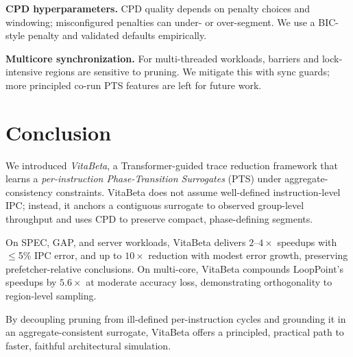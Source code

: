 \documentclass[conference]{IEEEtran}
\begin{document}
\textbf{CPD hyperparameters.} CPD quality depends on penalty choices and windowing; misconfigured penalties can under- or over-segment. We use a BIC-style penalty and validated defaults empirically.

\textbf{Multicore synchronization.} For multi-threaded workloads, barriers and lock-intensive regions are sensitive to pruning. We mitigate this with sync guards; more principled co-run PTS features are left for future work.

\section{Conclusion}
\label{summary}
We introduced \emph{VitaBeta}, a Transformer-guided trace reduction framework that learns a \emph{per-instruction Phase-Transition Surrogates} (PTS) under aggregate-consistency constraints. VitaBeta does not assume well-defined instruction-level IPC; instead, it anchors a contiguous surrogate to observed group-level throughput and uses CPD to preserve compact, phase-defining segments.

On SPEC, GAP, and server workloads, VitaBeta delivers $2$–$4\times$ speedups with $\le$5\% IPC error, and up to $10\times$ reduction with modest error growth, preserving prefetcher-relative conclusions. On multi-core, VitaBeta compounds LoopPoint’s speedups by $5.6\times$ at moderate accuracy loss, demonstrating orthogonality to region-level sampling.

By decoupling pruning from ill-defined per-instruction cycles and grounding it in an aggregate-consistent surrogate, VitaBeta offers a principled, practical path to faster, faithful architectural simulation.



\end{document}
